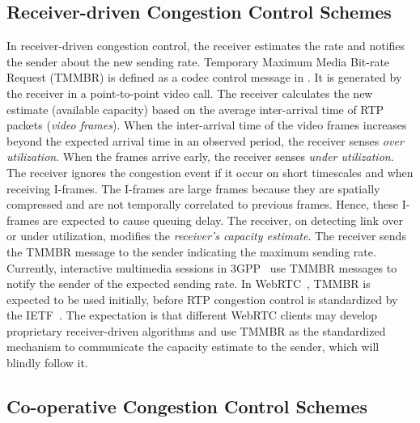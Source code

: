 \subsection{Receiver-driven Congestion Control Schemes}

In receiver-driven congestion control, the receiver estimates the rate and
notifies the sender about the new sending rate. Temporary Maximum Media 
Bit-rate Request (TMMBR) is defined as a codec control message in \cite{rfc5104}.
It is generated by the receiver in a point-to-point video call. The receiver
calculates the new estimate (available capacity) based on the average 
inter-arrival time of RTP packets (\emph{video frames}). When the inter-arrival time
of the video frames increases beyond the expected arrival time in an observed
period, the receiver senses \emph{over utilization}. When the frames arrive early, the
receiver senses \emph{under utilization}. The receiver ignores the congestion event 
if it occur on short timescales and when receiving I-frames. 
The I-frames are large frames because they are spatially compressed and
are not temporally correlated to previous frames. Hence, these I-frames are
expected to cause queuing delay. The receiver, on detecting link over
or under utilization, modifies the \emph{receiver's capacity estimate}. 
The receiver sends the TMMBR message to the sender
indicating the maximum sending rate. Currently, interactive multimedia sessions
in 3GPP~\cite{3gpp.26.114} use TMMBR messages to notify the sender of the
expected sending rate. In WebRTC~\cite{jennings:2013:webrtc}, TMMBR is
expected to be used initially, before RTP congestion control is standardized
by the IETF~\cite{rtp-usage}. The expectation is that different WebRTC clients
may develop proprietary receiver-driven algorithms and use TMMBR as the
standardized mechanism to communicate the capacity estimate to the sender,
which will blindly follow it.


\subsection{Co-operative Congestion Control Schemes}
\label{cc:co-op}

